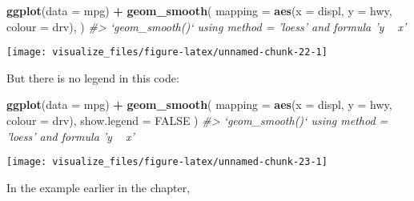 \documentclass[]{book}
\newenvironment{Shaded}{\begin{snugshade}}{\end{snugshade}}
\newcommand{\CommentTok}[1]{\textcolor[rgb]{0.56,0.35,0.01}{\textit{#1}}}
\newcommand{\DataTypeTok}[1]{\textcolor[rgb]{0.13,0.29,0.53}{#1}}
\newcommand{\KeywordTok}[1]{\textcolor[rgb]{0.13,0.29,0.53}{\textbf{#1}}}
\newcommand{\NormalTok}[1]{#1}
\newcommand{\OperatorTok}[1]{\textcolor[rgb]{0.81,0.36,0.00}{\textbf{#1}}}
\newcommand{\OtherTok}[1]{\textcolor[rgb]{0.56,0.35,0.01}{#1}}
\newcommand{\StringTok}[1]{\textcolor[rgb]{0.31,0.60,0.02}{#1}}
\theoremstyle{plain}
\theoremstyle{remark}
\theoremstyle{definition}
\theoremstyle{definition}
\theoremstyle{definition}
\theoremstyle{remark}
\begin{document}
\begin{Shaded}
\begin{Highlighting}[]
\KeywordTok{ggplot}\NormalTok{(}\DataTypeTok{data =}\NormalTok{ mpg) }\OperatorTok{+}
\StringTok{  }\KeywordTok{geom_smooth}\NormalTok{(}
    \DataTypeTok{mapping =} \KeywordTok{aes}\NormalTok{(}\DataTypeTok{x =}\NormalTok{ displ, }\DataTypeTok{y =}\NormalTok{ hwy, }\DataTypeTok{colour =}\NormalTok{ drv),}
\NormalTok{  )}
\CommentTok{#> `geom_smooth()` using method = 'loess' and formula 'y ~ x'}
\end{Highlighting}
\end{Shaded}

\begin{center}\texttt{[image: visualize\_files/figure-latex/unnamed-chunk-22-1]} \end{center}

But there is no legend in this code:

\begin{Shaded}
\begin{Highlighting}[]
\KeywordTok{ggplot}\NormalTok{(}\DataTypeTok{data =}\NormalTok{ mpg) }\OperatorTok{+}
\StringTok{  }\KeywordTok{geom_smooth}\NormalTok{(}
    \DataTypeTok{mapping =} \KeywordTok{aes}\NormalTok{(}\DataTypeTok{x =}\NormalTok{ displ, }\DataTypeTok{y =}\NormalTok{ hwy, }\DataTypeTok{colour =}\NormalTok{ drv),}
    \DataTypeTok{show.legend =} \OtherTok{FALSE}
\NormalTok{  )}
\CommentTok{#> `geom_smooth()` using method = 'loess' and formula 'y ~ x'}
\end{Highlighting}
\end{Shaded}

\begin{center}\texttt{[image: visualize\_files/figure-latex/unnamed-chunk-23-1]} \end{center}

In the example earlier in the chapter,
\end{document}
